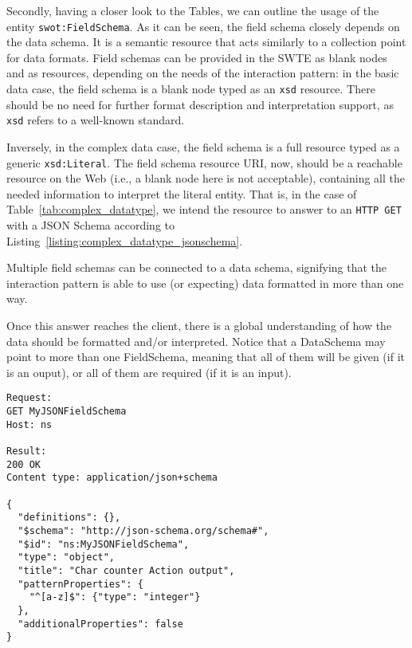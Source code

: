 Secondly, having a closer look to the Tables, we can outline the usage of the entity \texttt{swot:FieldSchema}. As it can be seen, the field schema closely depends on the data schema. It is a semantic resource that acts similarly to a collection point for data formats. Field schemas can be provided in the SWTE as blank nodes and as resources, depending on the needs of the interaction pattern: in the basic data case, the  field schema is a blank node typed as an \texttt{xsd} resource. There should be no need for further format description and interpretation support, as \texttt{xsd} refers to a well-known standard. 

Inversely, in the complex data case, the field schema is a full resource typed as a generic \texttt{xsd:Literal}. The field schema resource URI, now, should be a reachable resource on the Web (i.e., a blank node here is not acceptable), containing all the needed information to interpret the literal entity. That is, in the case of Table~\ref{tab:complex_datatype}, we intend the resource to answer to an \texttt{HTTP GET} with a JSON Schema according to Listing~\ref{listing:complex_datatype_jsonschema}.

Multiple field schemas can be connected to a data schema, signifying that the interaction pattern is able to use (or expecting) data formatted in more than one way.

Once this answer reaches the client, there is a global understanding of how the data should be formatted and/or interpreted. Notice that a DataSchema may point to more than one FieldSchema, meaning that all of them will be given (if it is an ouput), or all of them are required (if it is an input).\\
\begin{minipage}{\linewidth}
\begin{lstlisting}[caption={JSON Schema expected in response to an \texttt{HTTP GET} to \texttt{ns:MyJSONFieldSchema} as in Table~\ref{tab:complex_datatype} referring to the complex datatype example in Section~\ref{ssec:dataschema_fieldschema}.}, label={listing:complex_datatype_jsonschema}]
Request:
GET MyJSONFieldSchema
Host: ns

Result:
200 OK
Content type: application/json+schema

{
  "definitions": {},
  "$schema": "http://json-schema.org/schema#",
  "$id": "ns:MyJSONFieldSchema",
  "type": "object",
  "title": "Char counter Action output",
  "patternProperties": {
    "^[a-z]$": {"type": "integer"}
  },
  "additionalProperties": false
}
\end{lstlisting}
\end{minipage}

